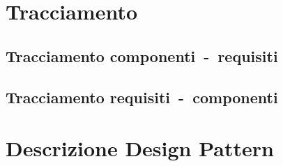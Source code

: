 \documentclass{scalatekids-article}
\begin{document}
\section{Tracciamento}

\subsection{Tracciamento componenti\ -\ requisiti}

\subsection{Tracciamento requisiti\ -\ componenti}

\appendix
\section{Descrizione Design Pattern}
\listoftables
\listoffigures
\end{document}
